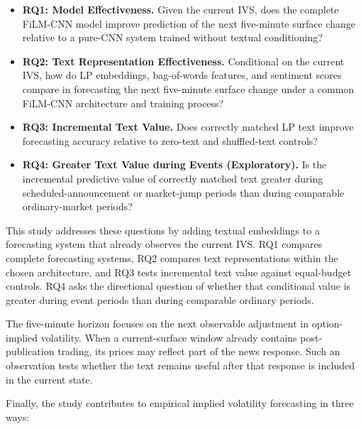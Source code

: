 \begin{itemize}
    \item \textbf{RQ1: Model Effectiveness.} Given the current IVS, does the complete FiLM-CNN model improve prediction of the next five-minute surface change relative to a pure-CNN system trained without textual conditioning?

    \item \textbf{RQ2: Text Representation Effectiveness.} Conditional on the current IVS, how do LP embeddings, bag-of-words features, and sentiment scores compare in forecasting the next five-minute surface change under a common FiLM-CNN architecture and training process?

    \item \textbf{RQ3: Incremental Text Value.} Does correctly matched LP text improve forecasting accuracy relative to zero-text and shuffled-text controls?

    \item \textbf{RQ4: Greater Text Value during Events (Exploratory).} Is the incremental predictive value of correctly matched text greater during scheduled-announcement or market-jump periods than during comparable ordinary-market periods?
\end{itemize}



This study addresses these questions by adding textual embeddings to a forecasting system that already observes the current IVS. RQ1 compares complete forecasting systems, RQ2 compares text representations within the chosen architecture, and RQ3 tests incremental text value against equal-budget controls. RQ4 asks the directional question of whether that conditional value is greater during event periods than during comparable ordinary periods. 


The five-minute horizon focuses on the next observable adjustment in option-implied volatility. When a current-surface window already contains post-publication trading, its prices may reflect part of the news response. Such an observation tests whether the text remains useful after that response is included in the current state. 


Finally, the study contributes to empirical implied volatility forecasting in three ways:


